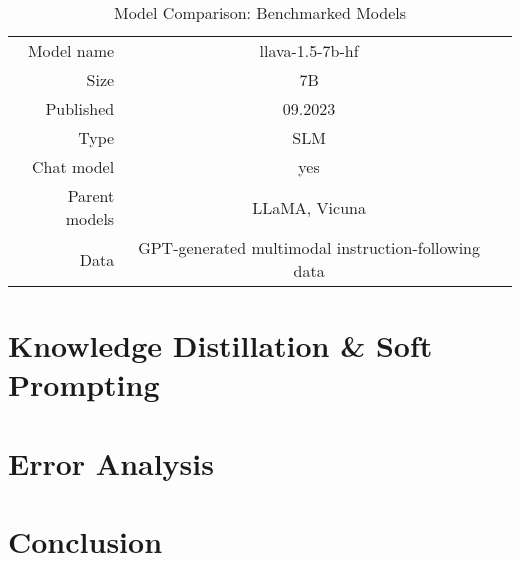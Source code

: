 \documentclass{article}
\begin{document}
\begin{table}
\centering
\begin{tabular}{rcc}
	\toprule
	Model name & llava-1.5-7b-hf & \\
	Size & 7B & \\
	Published & 09.2023 & \\
	Type & SLM & \\
	Chat model & yes & \\
	Parent models & LLaMA, Vicuna & \\
	Data & GPT-generated multimodal instruction-following data & \\
	\bottomrule
\end{tabular}
\caption{Model Comparison: Benchmarked Models}
\end{table}



\section{Knowledge Distillation \& Soft Prompting}
\label{knowledge-distillation}

\section{Error Analysis}
\label{error-analysis}

\section{Conclusion}
\label{Conclusion}



\end{document}
